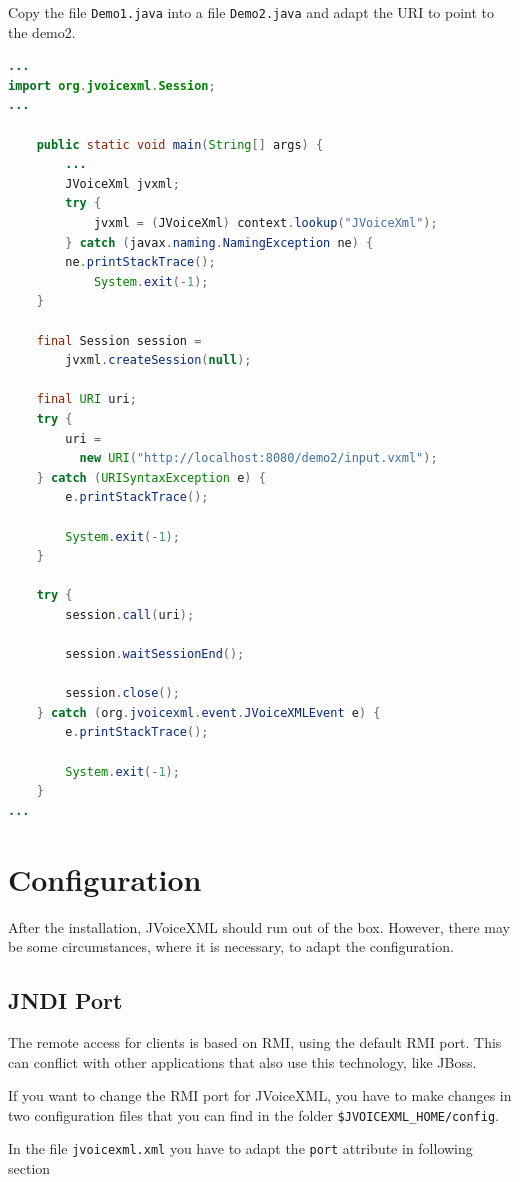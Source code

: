 \documentclass[11pt,a4paper]{article}
\begin{document}
Copy the file \texttt{Demo1.java} into a file \texttt{Demo2.java} and adapt the
URI to point to the demo2.

\begin{lstlisting}[language=Java]
...
import org.jvoicexml.Session;
...

    public static void main(String[] args) {
        ...
        JVoiceXml jvxml;
        try {
            jvxml = (JVoiceXml) context.lookup("JVoiceXml");
        } catch (javax.naming.NamingException ne) {
	    ne.printStackTrace();
            System.exit(-1);
    }

    final Session session = 
        jvxml.createSession(null);

    final URI uri;
    try {
        uri = 
          new URI("http://localhost:8080/demo2/input.vxml");
    } catch (URISyntaxException e) {
        e.printStackTrace();

        System.exit(-1);
    }

    try {
        session.call(uri);

        session.waitSessionEnd();

        session.close();
    } catch (org.jvoicexml.event.JVoiceXMLEvent e) {
        e.printStackTrace();

        System.exit(-1);
    }
...
\end{lstlisting}

\section{Configuration}

After the installation, JVoiceXML should run out of the box. However, there may 
be some circumstances, where it is necessary, to adapt the configuration.

\subsection{JNDI Port}

The remote access for clients is based on RMI, using the default RMI port. This
can conflict with other applications that also use this technology, like JBoss.

If you want to change the RMI port for JVoiceXML, you have to make changes in 
two configuration files that you can find in the folder 
\texttt{\$JVOICE\-XML\_HOME/config}.

In the file \texttt{jvoicexml.xml} you have to adapt the \texttt{port} 
attribute in following section
\end{document}
